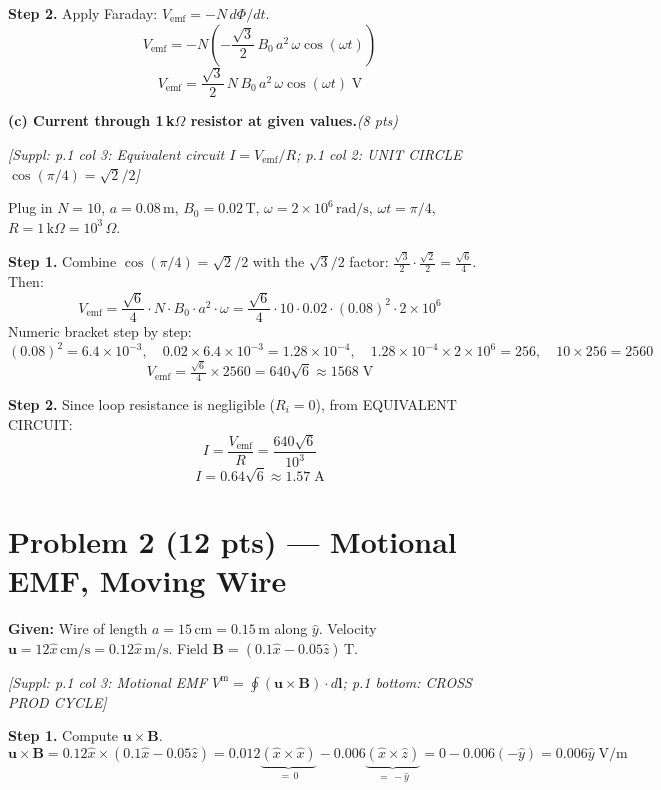 \documentclass[11pt,letterpaper]{article}
\newcommand{\refbox}[1]{\textcolor{ref}{\textit{[Suppl: #1]}}}
\newcommand{\ptag}[1]{\hfill\textit{(#1 pts)}}
\newcommand{\step}[1]{\medskip\noindent\textbf{Step #1.}\enspace}
\begin{document}
\step{2} Apply Faraday: $V_\text{emf}=-N\,d\Phi/dt$.
\[
V_\text{emf} = -N\left(-\frac{\sqrt{3}}{2}\,B_0\,a^2\,\omega\cos(\omega t)\right)
\]
\[
\boxed{V_\text{emf} = \frac{\sqrt{3}}{2}\,N\,B_0\,a^2\,\omega\cos(\omega t)\;\text{V}}
\]

\medskip

\textbf{(c) Current through 1\,k$\Omega$ resistor at given values.}\ptag{8}

\refbox{p.1 col 3: Equivalent circuit $I=V_\text{emf}/R$; p.1 col 2: UNIT CIRCLE $\cos(\pi/4)=\sqrt{2}/2$}

Plug in $N=10$, $a=0.08\,\text{m}$, $B_0=0.02\,\text{T}$, $\omega=2\times10^6\,\text{rad/s}$,
$\omega t=\pi/4$, $R=1\,\text{k}\Omega=10^3\,\Omega$.

\step{1} Combine $\cos(\pi/4)=\sqrt{2}/2$ with the $\sqrt{3}/2$ factor:
$\tfrac{\sqrt{3}}{2}\cdot\tfrac{\sqrt{2}}{2}=\tfrac{\sqrt{6}}{4}$. Then:
\[
V_\text{emf}
= \frac{\sqrt{6}}{4}\cdot N\cdot B_0\cdot a^2\cdot\omega
= \frac{\sqrt{6}}{4}\cdot 10\cdot 0.02\cdot(0.08)^2\cdot 2\times10^6
\]
Numeric bracket step by step:
\[
(0.08)^2=6.4\times10^{-3},\quad
0.02\times6.4\times10^{-3}=1.28\times10^{-4},\quad
1.28\times10^{-4}\times2\times10^6=256,\quad
10\times256=2560
\]
\[
V_\text{emf} = \tfrac{\sqrt{6}}{4}\times2560 = 640\sqrt{6}\approx 1568\;\text{V}
\]

\step{2} Since loop resistance is negligible ($R_i=0$), from EQUIVALENT CIRCUIT:
\[
I = \frac{V_\text{emf}}{R} = \frac{640\sqrt{6}}{10^3}
\]
\[
\boxed{I = 0.64\sqrt{6}\approx 1.57\;\text{A}}
\]

\section*{Problem 2 (12 pts) --- Motional EMF, Moving Wire}

\textbf{Given:} Wire of length $a=15\,\text{cm}=0.15\,\text{m}$ along $\hat{y}$.
Velocity $\mathbf{u}=12\hat{x}\,\text{cm/s}=0.12\hat{x}\,\text{m/s}$.
Field $\mathbf{B}=(0.1\hat{x}-0.05\hat{z})\,\text{T}$.

\refbox{p.1 col 3: Motional EMF $V^\text{m}=\oint(\mathbf{u}\times\mathbf{B})\cdot d\mathbf{l}$;
p.1 bottom: CROSS PROD CYCLE}

\step{1} Compute $\mathbf{u}\times\mathbf{B}$.
\[
\mathbf{u}\times\mathbf{B} = 0.12\hat{x}\times(0.1\hat{x}-0.05\hat{z})
= 0.012\underbrace{(\hat{x}\times\hat{x})}_{=\,0} - 0.006\underbrace{(\hat{x}\times\hat{z})}_{=\,-\hat{y}}
= 0 - 0.006(-\hat{y}) = 0.006\hat{y}\;\text{V/m}
\]
\end{document}
